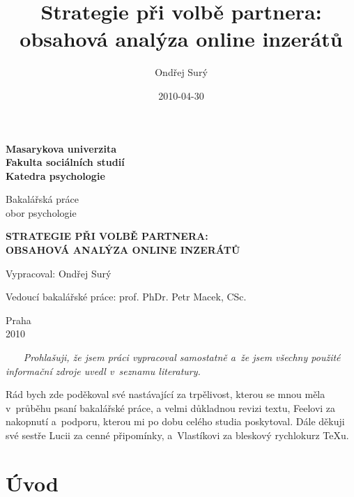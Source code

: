 \documentclass[a4paper, 12pt, notitlepage, oneside, numbers=noenddot]{report}
\title{Strategie při volbě partnera: obsahová analýza online inzerátů}
\author{Ondřej Surý}
\date{2010-04-30}
\begin{document}
\pagestyle{empty}
\begin{titlepage}

  \begin{center}
    \bf{Masarykova univerzita}\\
    \bf{Fakulta sociálních studií}\\
    \bf{Katedra psychologie}\\

    \vspace{2cm}

    Bakalářská práce\\
    obor psychologie

    \vspace{2cm}

    \large{\bf{STRATEGIE PŘI VOLBĚ PARTNERA:\\ OBSAHOVÁ ANALÝZA ONLINE INZERÁTŮ}}\\

    \normalsize

    \vspace{2cm}

    \noindent Vypracoval: Ondřej Surý\\
    \vspace{2cm}

    \noindent Vedoucí bakalářské práce: prof. PhDr. Petr Macek, CSc. \\
  
    \vfill

    Praha\\
    2010
  \end{center}
\end{titlepage}

\pagestyle{empty}
~~~
\vfill
\emph{Prohlašuji, že jsem práci vypracoval samostatně a~že jsem všechny použité informační zdroje uvedl v~seznamu literatury.}
\clearpage

Rád bych zde poděkoval své nastávající za trpělivost, kterou se mnou
měla v~průběhu psaní bakalářské práce, a velmi důkladnou revizi textu,
Feelovi za nakopnutí a~podporu, kterou mi po dobu celého studia
poskytoval.  Dále děkuji své sestře Lucii za cenné připomínky,
a~Vlastíkovi za bleskový rychlokurz TeXu.

\clearpage
\thispagestyle{empty}
\tableofcontents
\clearpage
\thispagestyle{empty}
\listoftables
\clearpage

\pagestyle{plain}
\setcounter{page}{1}

\chapter{Úvod}
\end{document}

